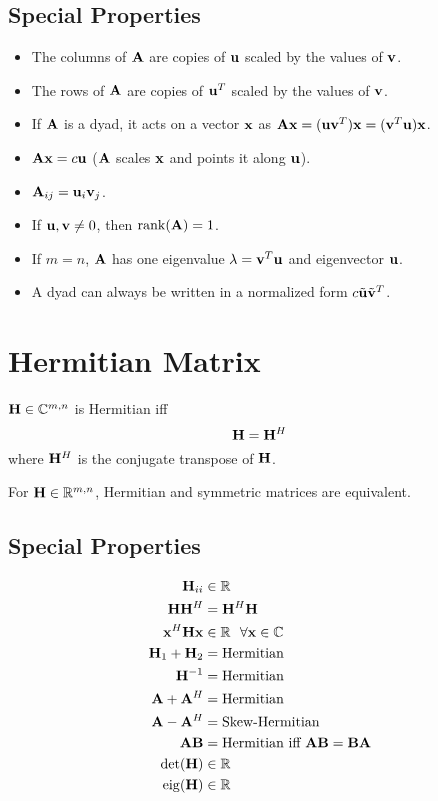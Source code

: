 \subsection*{Special Properties}
\begin{itemize}
\item The columns of $\mathbf{A}$ are copies of $\mathbf{u}$ scaled by the values of $\mathbf{v}$.
\item The rows of $\mathbf{A}$ are copies of $\mathbf{u}^T$ scaled by the values of $\mathbf{v}$.
\item If $\mathbf{A}$ is a dyad, it acts on a vector $\mathbf{x}$ as $\mathbf{A}\mathbf{x}=(\mathbf{u}\mathbf{v}^T)\mathbf{x}=(\mathbf{v}^T\mathbf{u})\mathbf{x}$.
\item $\mathbf{A}\mathbf{x}=c\mathbf{u}$ ($\mathbf{A}$ scales $\mathbf{x}$ and points it along $\mathbf{u}$).
\item $\mathbf{A}_{ij}=\mathbf{u}_i\mathbf{v}_j$.
\item If $\mathbf{u},\mathbf{v}\ne0$, then $\operatorname{rank}(\mathbf{A})=1$.
\item If $m=n$, $\mathbf{A}$ has one eigenvalue $\lambda=\mathbf{v}^T\mathbf{u}$ and eigenvector $\mathbf{u}$.
\item A dyad can always be written in a normalized form $c\tilde{\mathbf{u}}\tilde{\mathbf{v}}^T$.
\end{itemize}



\section{Hermitian Matrix}
$\mathbf{H}\in\mathbb{C}^{m,n}$ is Hermitian iff
\begin{equation}
\mathbf{H}=\mathbf{H}^H
\end{equation}
where $\mathbf{H}^H$ is the conjugate transpose of $\mathbf{H}$.

For $\mathbf{H}\in\mathbb{R}^{m,n}$, Hermitian and symmetric matrices are equivalent.

\subsection*{Special Properties}
\begin{align}
\mathbf{H}_{ii} &\in \mathbb{R}      \\
\mathbf{H}\mathbf{H}^H &=   \mathbf{H}^H\mathbf{H} \\
\mathbf{x}^H\mathbf{H}\mathbf{x} &\in \mathbb{R}~~\forall\mathbf{x}\in\mathbb{C} \\
\mathbf{H}_1+\mathbf{H}_2 &= \textrm{Hermitian} \\
\mathbf{H}^{-1}    &= \textrm{Hermitian} \\
\mathbf{A}+\mathbf{A}^H   &= \textrm{Hermitian} \\
\mathbf{A}-\mathbf{A}^H   &= \textrm{Skew-Hermitian} \\
\mathbf{A}\mathbf{B}      &= \textrm{Hermitian iff $\mathbf{A}\mathbf{B}=\mathbf{B}\mathbf{A}$} \\
\det(\mathbf{H})   &\in \mathbb{R} \\
\operatorname{eig}(\mathbf{H})   &\in \mathbb{R}
\end{align}



